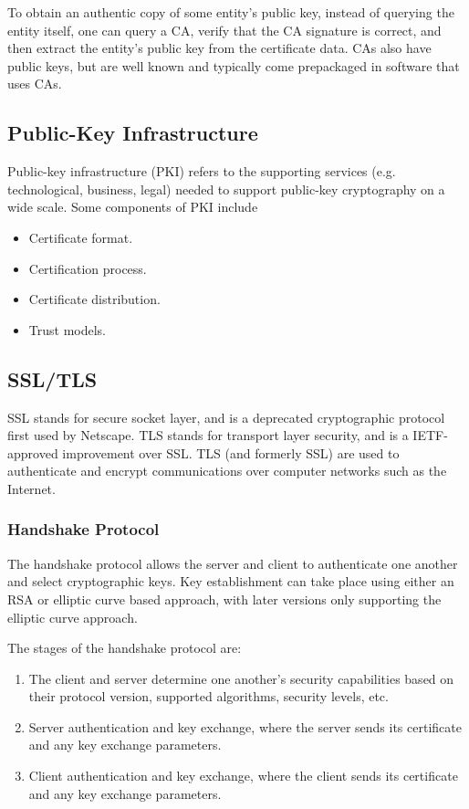 \documentclass[12pt,titlepage]{article}
\begin{document}
      To obtain an authentic copy of some entity's public key, instead of querying the entity itself, one
      can query a CA, verify that the CA signature is correct, and then extract the entity's public
      key from the certificate data. CAs also have public keys, but are well known and typically come prepackaged
      in software that uses CAs.

    \subsection{Public-Key Infrastructure}
      Public-key infrastructure (PKI) refers to the supporting services (e.g. technological, business, legal) needed
      to support public-key cryptography on a wide scale. Some components of PKI include
      \begin{itemize}
        \item Certificate format.
        \item Certification process.
        \item Certificate distribution.
        \item Trust models.
      \end{itemize}

    \subsection{SSL/TLS}
      SSL stands for secure socket layer, and is a deprecated cryptographic protocol first used by Netscape. TLS stands
      for transport layer security, and is a IETF-approved improvement over SSL. TLS (and formerly SSL) are used to
      authenticate and encrypt communications over computer networks such as the Internet.

      \subsubsection{Handshake Protocol}
        The handshake protocol allows the server and client to authenticate one another and select cryptographic keys.
        Key establishment can take place using either an RSA or elliptic curve based approach, with later versions only
        supporting the elliptic curve approach.

        The stages of the handshake protocol are:
        \begin{enumerate}
          \item The client and server determine one another's security capabilities based on their protocol version, supported
            algorithms, security levels, etc.
          \item Server authentication and key exchange, where the server sends its certificate and any key exchange parameters.
          \item Client authentication and key exchange, where the client sends its certificate and any key exchange parameters.
        \end{enumerate}
\end{document}
